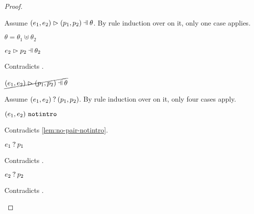 \begin{proof}
\begin{byCases}
\begin{byCases}
\begin{byCases}
\begin{pfsteps*}
            \end{pfsteps*}
            Assume $\hpatmatch{\hpair{e_1}{e_2}}{\hpair{p_1}{p_2}}{\theta}$. By rule induction over  on it, only one case applies.
            \begin{byCases}
            \item[\text{(\ref{rule:MPair})}]
                \begin{pfsteps*}
                \item $\theta=\theta_1\uplus\theta_2$
                \item $\hpatmatch{e_2}{p_2}{\theta_2}$ 
                \end{pfsteps*}
                Contradicts .
            \end{byCases}
            \begin{pfsteps*}
            \item $\cancel{\hpatmatch{\hpair{e_1}{e_2}}{\hpair{p_1}{p_2}}{\theta}}$ 
            \end{pfsteps*}
            Assume $(e_1 , e_2) \mathbin{?} (p_1 , p_2)$. By rule induction over  on it, only four cases apply.
            \begin{byCases}
            \item[\text{(\ref{rule:MMNotIntro})}]
                \begin{pfsteps*}
                \item $(e_1 , e_2) ~\mathtt{notintro}$ 
                \end{pfsteps*}
                Contradicts \autoref{lem:no-pair-notintro}.
            \item[\text{(\ref{rule:MMPairL})}]
                \begin{pfsteps*}
                \item $e_1 \mathbin{?} p_1$ 
                \end{pfsteps*}
                Contradicts .
            \item[\text{(\ref{rule:MMPairR})}]
                \begin{pfsteps*}
                \item $e_2 \mathbin{?} p_2$ 
                \end{pfsteps*}
                Contradicts .

\end{byCases}
\end{byCases}
\end{byCases}
\end{byCases}
\end{proof}
